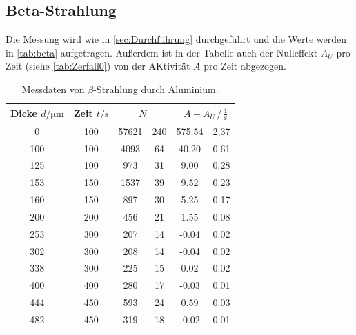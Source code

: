 \subsection{Beta-Strahlung}
\label{sub:beta_aus}
Die Messung wird wie in \autoref{sec:Durchführung} durchgeführt und die Werte werden in \autoref{tab:beta} aufgetragen. 
Außerdem ist in der Tabelle auch der Nulleffekt $A_U$ pro Zeit (siehe \autoref{tab:Zerfall0}) von der AKtivität $A$ pro Zeit abgezogen.

\begin{table}[H]
  \centering
  \caption{Messdaten von $\beta$-Strahlung durch Aluminium.}
  \label{tab:beta}
  \begin{tabular}{S[table-format=3.0] S[table-format=3.0] S[table-format=5.0] @{${}\pm{}$} S[table-format=3.2] S[table-format=3.2] @{${}\pm{}$} S[table-format=2.2]}
  \toprule
  {Dicke $d / \si{\micro\meter}$} & {Zeit $t / \si{\second}$} &  &  \\
     &   100 &   57621   &   240 &   575.54  &   2,37   \\
      100 &   100 &   4093    &   64  &   40.20   &   0.61    \\
      125 &   100 &   973     &   31  &   9.00    &   0.28    \\
      153 &   150 &   1537    &   39  &   9.52    &   0.23    \\
      160 &   150 &   897     &   30  &   5.25    &   0.17    \\
      200 &   200 &   456     &   21  &   1.55    &   0.08    \\
      253 &   300 &   207     &   14  &   -0.04   &   0.02    \\
      302 &   300 &   208     &   14  &   -0.04   &   0.02    \\
      338 &   300 &   225     &   15  &   0.02    &   0.02    \\
      400 &   400 &   280     &   17  &   -0.03   &   0.01    \\
      444 &   450 &   593     &   24  &   0.59    &   0.03    \\
      482 &   450 &   319     &   18  &   -0.02   &   0.01    \\
  \bottomrule
  \end{tabular}
\end{table}


